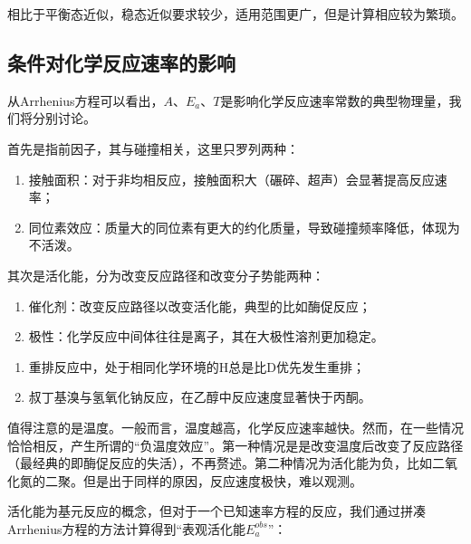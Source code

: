 相比于平衡态近似，稳态近似要求较少，适用范围更广，但是计算相应较为繁琐。
\subsection{条件对化学反应速率的影响}

从Arrhenius方程可以看出，$A$、$E_a$、$T$是影响化学反应速率常数的典型物理量，我们将分别讨论。

首先是指前因子，其与碰撞相关，这里只罗列两种：

\begin{proposition}[改变指前因子]
  \begin{enumerate}
    \item 接触面积：对于非均相反应，接触面积大（碾碎、超声）会显著提高反应速率；
    \item 同位素效应：质量大的同位素有更大的约化质量，导致碰撞频率降低，体现为不活泼。
  \end{enumerate}
\end{proposition}

其次是活化能，分为改变反应路径和改变分子势能两种：

\begin{proposition}[改变活化能]
  \begin{enumerate}
    \item 催化剂：改变反应路径以改变活化能，典型的比如酶促反应；
    \item 极性：化学反应中间体往往是离子，其在大极性溶剂更加稳定。
  \end{enumerate}
\end{proposition}

\begin{example}[指前因子和活化能]
  \begin{enumerate}
    \item 重排反应中，处于相同化学环境的$\text{H}$总是比$\text{D}$优先发生重排；
    \item 叔丁基溴与氢氧化钠反应，在乙醇中反应速度显著快于丙酮。
  \end{enumerate}
\end{example}

值得注意的是温度。一般而言，温度越高，化学反应速率越快。然而，在一些情况恰恰相反，产生所谓的“负温度效应”。第一种情况是是改变温度后改变了反应路径（最经典的即酶促反应的失活），不再赘述。第二种情况为活化能为负，比如二氧化氮的二聚。但是出于同样的原因，反应速度极快，难以观测。

活化能为基元反应的概念，但对于一个已知速率方程的反应，我们通过拼凑Arrhenius方程的方法计算得到“表观活化能$E_a^{obs}$”：

